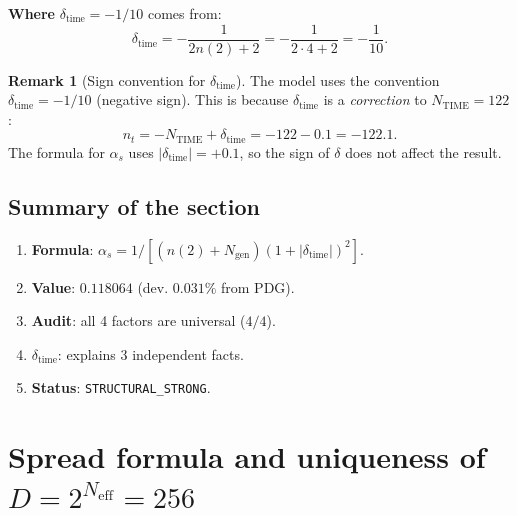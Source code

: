 \documentclass[11pt,a4paper]{article}
\theoremstyle{definition}
\newtheorem{remark}[theorem]{Remark}
\begin{document}
\medskip\noindent
\textbf{Where} $\delta_{\text{time}} = -1/10$ comes from:
\begin{equation}
    \delta_{\text{time}} = -\frac{1}{2n(2) + 2} = -\frac{1}{2 \cdot 4 + 2} = -\frac{1}{10}.
    \label{eq:delta-time-origin}
\end{equation}

\begin{remark}[Sign convention for $\delta_{\text{time}}$]
\label{rem:delta-time-convention}
The model uses the convention
$\delta_{\text{time}} = -1/10$ (negative sign).
This is because $\delta_{\text{time}}$ is a
\emph{correction} to $N_{\text{TIME}} = 122$:
\begin{equation}
    n_t = -N_{\text{TIME}} + \delta_{\text{time}}
    = -122 - 0.1 = -122.1.
\end{equation}
The formula for $\alpha_s$ uses
$|\delta_{\text{time}}| = +0.1$, so the sign of $\delta$
does not affect the result.
\end{remark}

\subsection{Summary of the section}
\label{subsec:alphas-summary}

\begin{enumerate}
    \item \textbf{Formula}: $\alpha_s = 1/[(n(2)+N_{\text{gen}})(1+|\delta_{\text{time}}|)^2]$.
    \item \textbf{Value}: $0.118064$ (dev. $0.031\%$ from PDG).
    \item \textbf{Audit}: all 4 factors are universal ($4/4$).
    \item \textbf{$\delta_{\text{time}}$}: explains 3 independent facts.
    \item \textbf{Status}: \texttt{STRUCTURAL\_STRONG}.
\end{enumerate}
\section{Spread formula and uniqueness of \texorpdfstring{$D = 2^{N_{\text{eff}}} = 256$}{D = 2\^{}N\_eff = 256}}
\label{sec:spread}
\end{document}
